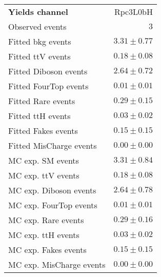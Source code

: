 

\begin{table}
\begin{center}
\setlength{\tabcolsep}{0.0pc}
{\small
\begin{tabular*}{\textwidth}{@{\extracolsep{\fill}}lr}
\noalign{\smallskip}\hline\noalign{\smallskip}
{\bfseries Yields channel}           & Rpc3L0bH              \\[-0.05cm]
\noalign{\smallskip}\hline\noalign{\smallskip}
Observed events          & $3$                    \\
\noalign{\smallskip}\hline\noalign{\smallskip}
Fitted bkg events         & $3.31 \pm 0.77$              \\
\noalign{\smallskip}\hline\noalign{\smallskip}
        Fitted ttV events         & $0.18 \pm 0.08$              \\
        Fitted Diboson events         & $2.64 \pm 0.72$              \\
        Fitted FourTop events         & $0.01 \pm 0.01$              \\
        Fitted Rare events         & $0.29 \pm 0.15$              \\
        Fitted ttH events         & $0.03 \pm 0.02$              \\
        Fitted Fakes events         & $0.15 \pm 0.15$              \\
        Fitted MisCharge events         & $0.00 \pm 0.00$              \\
 \noalign{\smallskip}\hline\noalign{\smallskip}
MC exp. SM events              & $3.31 \pm 0.84$              \\
\noalign{\smallskip}\hline\noalign{\smallskip}
        MC exp. ttV events         & $0.18 \pm 0.08$              \\
        MC exp. Diboson events         & $2.64 \pm 0.78$              \\
        MC exp. FourTop events         & $0.01 \pm 0.01$              \\
        MC exp. Rare events         & $0.29 \pm 0.16$              \\
        MC exp. ttH events         & $0.03 \pm 0.02$              \\
        MC exp. Fakes events         & $0.15 \pm 0.15$              \\
        MC exp. MisCharge events         & $0.00 \pm 0.00$              \\

\end{tabular*}}
\end{center}
\end{table}
